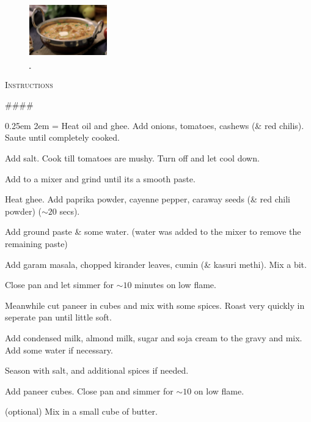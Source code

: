 \documentclass[8pt]{extarticle}
\let\orighref\href
\renewcommand{\href}[2]{\orighref{#1}{#2\,\faExternalLink}}
\newcommand{\recipe}[2][]{%
    \newpage
    \lhead{}%
    \chead{}%
    \rhead{}%
    \lfoot{}%
    \rfoot{}%
    \section{#2}%
    \if###1##%
    \else
        \begin{center}
            \parbox{0.75\linewidth}{\raggedright\itshape#1}%
        \end{center}
    \fi
}
\newcommand{\prepAndCookTime}[2]{%
	\fancyhead[C]{\footnotesize\color{headercolor}Prep Time: $\,$#1 \\ Cook Time: #2}}
\newcommand{\vegetarianAndServings}[1]{%
     \fancyhead[R]{\footnotesize\color{veggiecolor}\textmd{Vegetarian} \\ \footnotesize\color{headercolor}
     	#1 servings}}
\newcommand{\cuisineAndTotalTime}[2]{%
     \fancyhead[L]{\footnotesize\color{headercolor}\textmd{Cuisine: $\quad\,\,$ #1 \\ Total Time: #2}}}
\newcommand{\temp}[1]{%
    $#1^\circ$C}
\newcommand{\ingredients}[1][]{%
    \if###1##%
        {\color{SteelBlue!80!MidnightBlue}\Large\textsc{Ingredients}}%
    \else
        \emph{#1}%
    \fi
}
\newenvironment{ingreds}{%
    \parindent0pt
    \noindent
    \ingredients
    \par
    \smallskip
    \begin{multicols}{2}
    \leftskip1em
    \rightskip0pt plus 3em
    \parskip=0.0em
    \obeylines
    \everypar={\hangindent2em}
}{%
    \end{multicols}%
    \medskip
}
\newcounter{stepnum}
\newenvironment{method}[1][]{%
    \setcounter{stepnum}{0}
    \noindent
    {\color{SteelBlue!80!MidnightBlue}\Large\textsc{Instructions}}%
    \par
    \smallskip
    \if###1##%
    \else
        \noindent
        \emph{#1}
        \par
    \fi
    \begingroup
    \parindent0pt
    \parskip0.25em
        \leftskip2em
    \everypar={\llap{\stepcounter{stepnum}\hbox to2em{\thestepnum.\hfill}}}
}{%
    \par
    \endgroup}
\begin{document}
\begin{figure}[hp]
	\centering
	\includegraphics[width=0.30\textwidth]{recipePictures/PaneerButterMasala}
	\caption { \href{https://www.youtube.com/watch?v=oYZ--rdHL6I\&ab\_channel=HomeCookingShow}{} }
\end{figure}

\begin{method}%
	Heat oil and ghee. Add onions, tomatoes, cashews (\& red chilis). Saute until completely cooked. 
	
	Add salt. Cook till tomatoes are mushy. Turn off and let cool down. 
	
	Add to a mixer and grind until its a smooth paste.
	
	Heat ghee. Add paprika powder, cayenne pepper, caraway seeds (\& red chili powder) ($\sim 20$ secs).
	
	Add ground paste \& some water. (water was added to the mixer to remove the remaining paste) 
	
	Add garam masala, chopped kirander leaves, cumin (\& kasuri methi). Mix a bit.
	
	Close pan and let simmer for $\sim 10$ minutes on low flame. 
	
	Meanwhile cut paneer in cubes and mix with some spices. Roast very quickly in seperate pan until little soft. 
	
	Add condensed milk, almond milk, sugar and soja cream to the gravy and mix. Add some water if necessary. 
	
	Season with salt, and additional spices if needed.
	
	Add paneer cubes. Close pan and simmer for $\sim 10$ on low flame. 
	
	(optional) Mix in a small cube of butter. 
\end{method}

%
%
\end{document}
